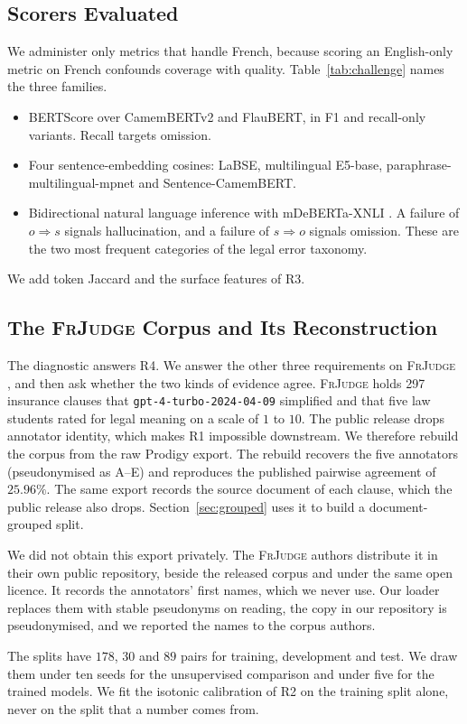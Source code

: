 \documentclass{BVP_JCLLT}
\newcommand{\rev}[1]{#1}
\newcommand{\rev}[1]{{\color{revcol}#1}}
\begin{document}
\subsection{Scorers Evaluated}\label{sec:scorers}

\rev{We administer only metrics that handle French, because scoring an
English-only metric on French confounds coverage with quality.
Table~\ref{tab:challenge} names the three families.

\begin{itemize}\itemsep1pt
\item BERTScore \cite{zhang2019bertscore} over CamemBERTv2 and FlauBERT, in F1
  and recall-only variants. Recall targets omission.
\item Four sentence-embedding cosines: LaBSE, multilingual E5-base,
  paraphrase-multilingual-mpnet and Sentence-CamemBERT.
\item Bidirectional natural language inference with mDeBERTa-XNLI
  \cite{laurer2024nli}. A failure of $o \Rightarrow s$ signals hallucination,
  and a failure of $s \Rightarrow o$ signals omission. These are the two most
  frequent categories of the legal error taxonomy.
\end{itemize}

We add token Jaccard and the surface features of R3.}

\subsection{The \textsc{FrJudge} Corpus and Its Reconstruction}\label{sec:corpus}

\rev{The diagnostic answers R4. We answer the other three requirements on
\textsc{FrJudge} \cite{beauchemin2025judgebert}, and then ask whether the two
kinds of evidence agree. \textsc{FrJudge} holds 297 insurance clauses that
\texttt{gpt-4-turbo-2024-04-09} simplified and that five law students rated for
legal meaning on a scale of $1$ to $10$. The public release drops annotator
identity, which makes R1 impossible downstream. We therefore rebuild the corpus
from the raw Prodigy export. The rebuild recovers the five annotators
(pseudonymised as A--E) and reproduces the published pairwise agreement of
$25.96\%$. The same export records the source document of each clause, which the
public release also drops. Section~\ref{sec:grouped} uses it to build a
document-grouped split.

We did not obtain this export privately. The \textsc{FrJudge} authors distribute
it in their own public repository, beside the released corpus and under the same
open licence. It records the annotators' first names, which we never use. Our
loader replaces them with stable pseudonyms on reading, the copy in our
repository is pseudonymised, and we reported the names to the corpus authors.

The splits have $178$, $30$ and $89$ pairs for training, development and test.
We draw them under ten seeds for the unsupervised comparison and under five for
the trained models. We fit the isotonic calibration of R2 on the training split
alone, never on the split that a number comes from.}
\end{document}
